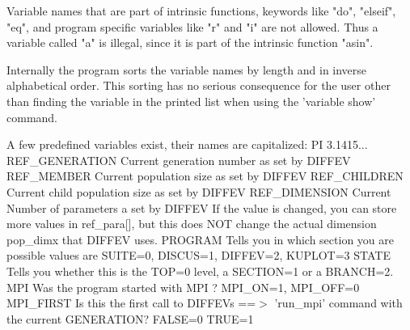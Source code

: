 Variable names that are part of intrinsic functions, keywords like 
"do", "elseif", "eq", and program specific variables like "r" and "i" 
are not allowed. Thus a variable called "a" is illegal, since it 
is part of the intrinsic function "asin". 
\par
Internally the program sorts the variable names by length and in 
inverse alphabetical order. This sorting has no serious consequence 
for the user other than finding the variable in the printed list 
when using the 'variable show' command. 
\par
A few predefined variables exist, their names are capitalized: 
PI  3.1415... 
REF\_GENERATION  Current generation number as set by DIFFEV 
REF\_MEMBER      Current population size   as set by DIFFEV 
REF\_CHILDREN    Current child population size as set by DIFFEV 
REF\_DIMENSION   Current Number of parameters a set by DIFFEV 
                If the value is changed, you can store more 
                values in ref\_para[], but this does NOT change 
                the actual dimension pop\_dimx that DIFFEV uses. 
PROGRAM         Tells you in which section you are possible 
                values are SUITE=0, DISCUS=1, DIFFEV=2, KUPLOT=3 
STATE           Tells you whether this is the TOP=0 level, a 
                SECTION=1 or a BRANCH=2. 
MPI             Was the program started with MPI ? 
                MPI\_ON=1, MPI\_OFF=0 
MPI\_FIRST       Is this the first call to DIFFEVs ==$> $ 'run\_mpi' 
                command with the current GENERATION? FALSE=0 TRUE=1 
